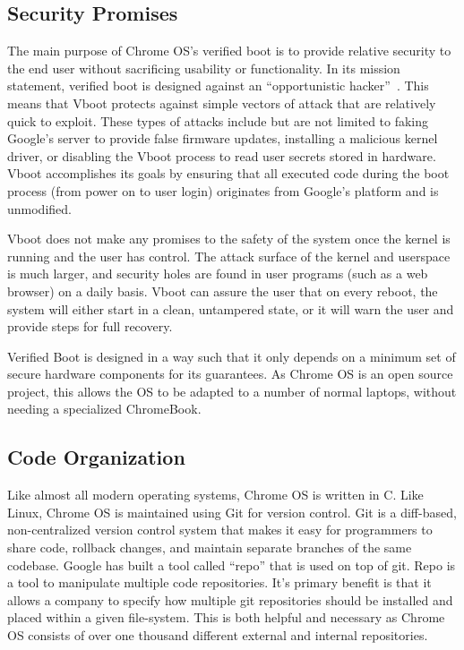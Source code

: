 \documentclass[../report.tex]{subfiles}
\begin{document}
\doublespacing

\newpage
{}

\subsection{Security Promises}

The main purpose of Chrome OS's verified boot is to provide relative security to the end user without sacrificing usability or functionality. 
In its mission statement, verified boot is designed against an ``opportunistic hacker''~\cite{vboot_doc}.
This means that Vboot protects against simple vectors of attack that are relatively quick to exploit.
These types of attacks include but are not limited to faking Google's server to provide false firmware updates, installing a malicious kernel driver, or disabling the Vboot process to read user secrets stored in hardware.
Vboot accomplishes its goals by ensuring that all executed code during the boot process (from power on to user login) originates from Google's platform and is unmodified. 

Vboot does not make any promises to the safety of the system once the kernel is running and the user has control. 
The attack surface of the kernel and userspace is much larger, and security holes are found in user programs (such as a web browser) on a daily basis.
Vboot can assure the user that on every reboot, the system will either start in a clean, untampered state, or it will warn the user and provide steps for full recovery.

Verified Boot is designed in a way such that it only depends on a minimum set of secure hardware components for its guarantees.
As Chrome OS is an open source project, this allows the OS to be adapted to a number of normal laptops, without needing a specialized ChromeBook.

\subsection{Code Organization}

Like almost all modern operating systems, Chrome OS is written in C.
Like Linux, Chrome OS is maintained using Git for version control. 
Git is a diff-based, non-centralized version control system that makes it easy for programmers to share code, rollback changes, and maintain separate branches of the same codebase.
Google has built a tool called ``repo'' that is used on top of git. 
Repo is a tool to manipulate multiple code repositories. 
It's primary benefit is that it allows a company to specify how multiple git repositories should be installed and placed within a given file-system.
This is both helpful and necessary as Chrome OS consists of over one thousand different external and internal repositories. 
\end{document}
